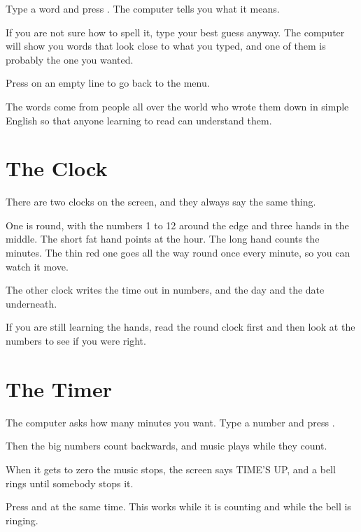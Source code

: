 \documentclass[12pt,oneside,paper=5.5in:8.5in,DIV=11,chapterprefix=false,headings=big]{scrbook}
\begin{document}

Type a word and press .
The computer tells you what it means.

If you are not sure how to spell it,
type your best guess anyway.
The computer will show you words
that look close to what you typed,
and one of them is probably the one you wanted.

Press  on an empty line to go back to the menu.

The words come from people all over the world
who wrote them down in simple English
so that anyone learning to read can understand them.

\chaptericon{\faClock[regular]}
\chapter{The Clock}


There are two clocks on the screen,
and they always say the same thing.

One is round, with the numbers 1 to 12 around the edge
and three hands in the middle.
The short fat hand points at the hour.
The long hand counts the minutes.
The thin red one goes all the way round
once every minute, so you can watch it move.

The other clock writes the time out in numbers,
and the day and the date underneath.

If you are still learning the hands,
read the round clock first
and then look at the numbers to see if you were right.

\chaptericon{\faHourglassHalf}
\chapter{The Timer}


The computer asks how many minutes you want.
Type a number and press .

Then the big numbers count backwards,
and music plays while they count.

When it gets to zero the music stops,
the screen says TIME'S UP,
and a bell rings until somebody stops it.

\begin{heads}
Press  and  at the same time.
This works while it is counting
and while the bell is ringing.
\end{heads}
\end{document}
